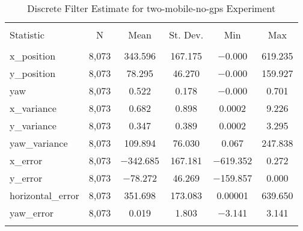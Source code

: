 
\begin{table}[h] \centering 
  \caption{Discrete Filter Estimate for two-mobile-no-gps Experiment} 
  \label{tab:two_mobile_no_gps_discrete_summary} 
\begin{tabular}{@{\extracolsep{5pt}}lccccc} 
\\[-1.8ex]\hline 
\hline \\[-1.8ex] 
Statistic & \multicolumn{1}{c}{N} & \multicolumn{1}{c}{Mean} & \multicolumn{1}{c}{St. Dev.} & \multicolumn{1}{c}{Min} & \multicolumn{1}{c}{Max} \\ 
\hline \\[-1.8ex] 
x\_position & 8,073 & 343.596 & 167.175 & $-$0.000 & 619.235 \\ 
y\_position & 8,073 & 78.295 & 46.270 & $-$0.000 & 159.927 \\ 
yaw & 8,073 & 0.522 & 0.178 & $-$0.000 & 0.701 \\ 
x\_variance & 8,073 & 0.682 & 0.898 & 0.0002 & 9.226 \\ 
y\_variance & 8,073 & 0.347 & 0.389 & 0.0002 & 3.295 \\ 
yaw\_variance & 8,073 & 109.894 & 76.030 & 0.067 & 247.838 \\ 
x\_error & 8,073 & $-$342.685 & 167.181 & $-$619.352 & 0.272 \\ 
y\_error & 8,073 & $-$78.272 & 46.269 & $-$159.857 & 0.000 \\ 
horizontal\_error & 8,073 & 351.698 & 173.083 & 0.00001 & 639.650 \\ 
yaw\_error & 8,073 & 0.019 & 1.803 & $-$3.141 & 3.141 \\ 
\hline \\[-1.8ex] 
\end{tabular} 
\end{table} 
